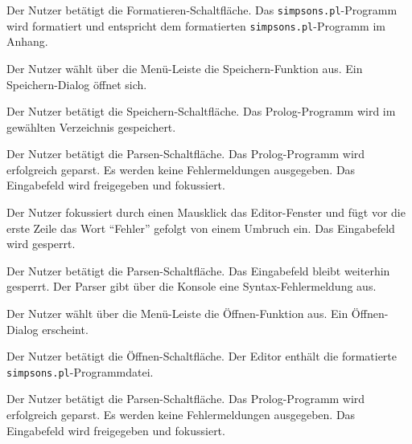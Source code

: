 \documentclass[parskip=full,11pt,twoside]{scrartcl}
\begin{document}
{Der Nutzer betätigt die Formatieren-Schaltfläche.}
{Das \texttt{simpsons.pl}-Programm wird formatiert und entspricht dem formatierten \texttt{simpsons.pl}-Programm im Anhang.}

{Der Nutzer wählt über die Menü-Leiste die Speichern-Funktion aus.}
{Ein Speichern-Dialog öffnet sich.}

{Der Nutzer betätigt die Speichern-Schaltfläche.}
{Das Prolog-Programm wird im gewählten Verzeichnis gespeichert.}

{Der Nutzer betätigt die Parsen-Schaltfläche.}
{Das Prolog-Programm wird erfolgreich geparst. Es werden keine Fehlermeldungen ausgegeben. Das Eingabefeld wird freigegeben und fokussiert.}

{Der Nutzer fokussiert durch einen Mausklick das Editor-Fenster und fügt vor die erste Zeile das Wort \enquote{Fehler} gefolgt von einem Umbruch ein.}
{Das Eingabefeld wird gesperrt.}

{Der Nutzer betätigt die Parsen-Schaltfläche.}
{Das Eingabefeld bleibt weiterhin gesperrt. Der Parser gibt über die Konsole eine Syntax-Fehlermeldung aus.}


{Der Nutzer wählt über die Menü-Leiste die Öffnen-Funktion aus.}
{Ein Öffnen-Dialog erscheint.}

{Der Nutzer betätigt die Öffnen-Schaltfläche.}
{Der Editor enthält die formatierte \texttt{simpsons.pl}-Programmdatei.}

{Der Nutzer betätigt die Parsen-Schaltfläche.}
{Das Prolog-Programm wird erfolgreich geparst. Es werden keine Fehlermeldungen ausgegeben. Das Eingabefeld wird freigegeben und fokussiert.}
\end{document}

